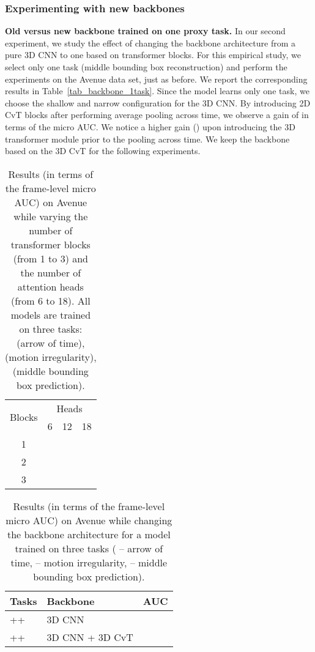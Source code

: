 \documentclass[times,twocolumn,final,authoryear]{elsarticle}
\begin{document}
\subsubsection{Experimenting with new backbones}

\noindent
{\bf Old versus new backbone trained on one proxy task.}
In our second experiment, we study the effect of changing the backbone architecture from a pure 3D CNN to one based on transformer blocks. For this empirical study, we select only one task (middle bounding box reconstruction) and perform the experiments on the Avenue data set, just as before. We report the corresponding results in Table~\ref{tab_backbone_1task}. Since the model learns only one task, we choose the shallow and narrow \citep{Georgescu-CVPR-2021} configuration for the 3D CNN. By introducing 2D CvT blocks after performing average pooling across time, we observe a gain of  in terms of the micro AUC. We notice a higher gain () upon introducing the 3D transformer module prior to the pooling across time. We keep the backbone based on the 3D CvT for the following experiments.

\begin{table}[t]
\caption{Results (in terms of the frame-level micro AUC) on Avenue while varying the number of transformer blocks (from 1 to 3) and the number of attention heads (from 6 to 18). All models are trained on three tasks:  (arrow of time),  (motion irregularity),  (middle bounding box prediction).}\label{tab_architecture_size}
\begin{center}
\begin{tabular}{|c|c|c|c|}
\hline
\multirow{2}{*}{{Blocks}} & \multicolumn{3}{|c|}{{Heads}} \\
\cline{2-4}
                                & {6} & {12} & {18} \\
\hline
\hline
{1} &  &  &  \\
{2} &  &  &  \\
{3} &  &  &  \\
\hline
\end{tabular}
\end{center}
\end{table}

\begin{table}[t]
\caption{Results (in terms of the frame-level micro AUC) on Avenue while changing the backbone architecture for a model trained on three tasks ( -- arrow of time,  -- motion irregularity,  -- middle bounding box prediction).}\label{tab_backbone_3task}
\begin{center}
\begin{tabular}{|l|l|c|}
\hline
{Tasks} & {Backbone} & {AUC} \\
\hline\hline
++   & 3D CNN            &  \\
++   & 3D CNN + 3D CvT   &  \\
\hline
\end{tabular}
\end{center}
\end{table}
\end{document}

